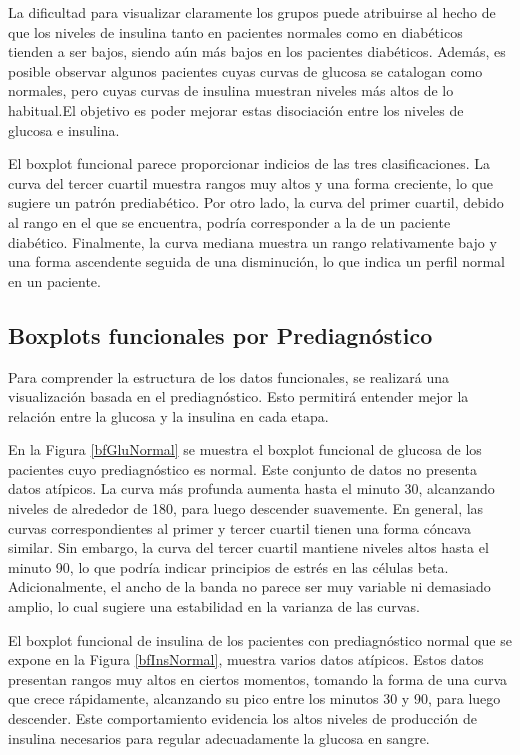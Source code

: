 La dificultad para visualizar claramente los grupos puede atribuirse al hecho de que los niveles de insulina tanto en pacientes normales como en diabéticos tienden a ser bajos, siendo aún más bajos en los pacientes diabéticos. Además, es posible observar algunos pacientes cuyas curvas de glucosa se catalogan como normales, pero cuyas curvas de insulina muestran niveles más altos de lo habitual.El objetivo es poder mejorar estas disociación entre los niveles de glucosa e insulina.


El boxplot funcional parece proporcionar indicios de las tres clasificaciones. La curva del tercer cuartil muestra rangos muy altos y una forma creciente, lo que sugiere un patrón prediabético. Por otro lado, la curva del primer cuartil, debido al rango en el que se encuentra, podría corresponder a la de un paciente diabético. Finalmente, la curva mediana muestra un rango relativamente bajo y una forma ascendente seguida de una disminución, lo que indica un perfil normal en un paciente.

\subsection{Boxplots funcionales por Prediagnóstico}

Para comprender la estructura de los datos funcionales, se realizará una visualización basada en el prediagnóstico. Esto permitirá entender mejor la relación entre la glucosa y la insulina en cada etapa.

En la Figura \ref{bfGluNormal} se muestra el boxplot funcional de glucosa de los pacientes cuyo prediagnóstico es normal. Este conjunto de datos no presenta datos atípicos. La curva más profunda aumenta hasta el minuto 30, alcanzando niveles de alrededor de 180, para luego descender suavemente. En general, las curvas correspondientes al primer y tercer cuartil tienen una forma cóncava similar. Sin embargo, la curva del tercer cuartil mantiene niveles altos hasta el minuto 90, lo que podría indicar principios de estrés en las células beta. Adicionalmente, el ancho de la banda no parece ser muy variable ni demasiado amplio, lo cual sugiere una estabilidad en la varianza de las curvas.

El boxplot funcional de insulina de los pacientes con prediagnóstico normal que se expone en la Figura \ref{bfInsNormal}, muestra varios datos atípicos. Estos datos presentan rangos muy altos en ciertos momentos, tomando la forma de una curva que crece rápidamente, alcanzando su pico entre los minutos 30 y 90, para luego descender. Este comportamiento evidencia los altos niveles de producción de insulina necesarios para regular adecuadamente la glucosa en sangre.

